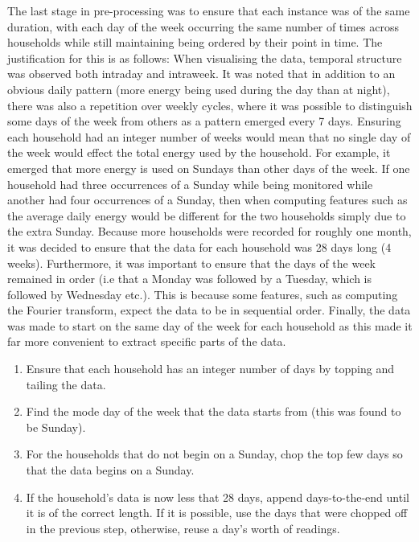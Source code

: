 The last stage in pre-processing was to ensure that each instance was of the same duration, with each day of the week occurring the same number of times across households while still maintaining being ordered by their point in time. The justification for this is as follows:
When visualising the data, temporal structure was observed both intraday and intraweek. It was noted that in addition to an obvious daily pattern (more energy being used during the day than at night), there was also a repetition over weekly cycles, where it was possible to distinguish some days of the week from others as a pattern emerged every 7 days.  Ensuring each household had an integer number of weeks would mean that no single day of the week would effect the total energy used by the household. For example, it emerged that more energy is used on Sundays than other days of the week. If one household had three occurrences of a Sunday while being monitored while another had four occurrences of a Sunday, then when computing features such as the average daily energy would be different for the two households simply due to the extra Sunday. Because more households were recorded for roughly one month, it was decided to ensure that the data for each household was 28 days long (4 weeks). Furthermore, it was important to ensure that the days of the week remained in order (i.e that a Monday was followed by a Tuesday, which is followed by Wednesday etc.). This is because some features, such as computing the Fourier transform, expect the data to be in sequential order. Finally, the data was made to start on the same day of the week for each household as this made it far more convenient to extract specific parts of the data.

\begin{enumerate}
\item Ensure that each household has an integer number of days by topping and tailing the data.
\item Find the mode day of the week that the data starts from (this was found to be Sunday).
\item For the households that do not begin on a Sunday, chop the top few days so that the data begins on a Sunday.
\item If the household's data is now less that 28 days, append days-to-the-end until it is of the correct length. If it is possible, use the days that were chopped off in the previous step, otherwise, reuse a day's worth of readings.
\end{enumerate}


